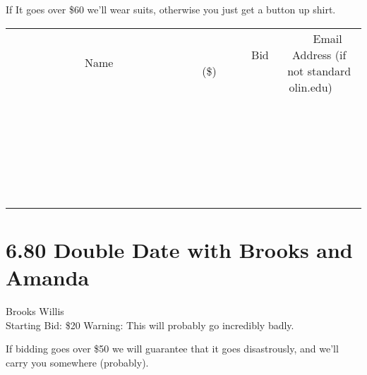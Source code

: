 \documentclass[11pt]{article}
\begin{document}
If It goes over \$60 we'll wear suits, otherwise you just get a button up shirt.
\\[6ex]
\begin{tabular}{c c c}
~~~~~~~~~~~~~Name~~~~~~~~~~~~~ & ~~~~~~~~~Bid (\$)~~~~~~~~~  & ~~~Email Address (if not standard olin.edu)~~~\\
 & & \\
\hline
 & & \\
\hline
 & & \\
\hline
 & & \\
\hline
 & & \\
\hline
 & & \\
\hline
 & & \\
\hline
 & & \\
\hline
 & & \\
\hline
 & & \\
\hline
 & & \\
\hline
 & & \\
\hline
 & & \\
\hline
 & & \\
\hline
 & & \\
\hline
 & & \\
\hline
 & & \\
\hline
 & & \\
\hline
 & & \\
\hline
 & & \\
\hline
 & & \\
\hline
 & & \\
\hline
 & & \\
\hline
 & & \\
\hline
 & & \\
\hline
 & & \\
\hline
\end{tabular}
\newpage
\section*{6.80 Double Date with Brooks and Amanda}
Brooks Willis
\\
Starting Bid: \$20
\newline
Warning: This will probably go incredibly badly.

If bidding goes over \$50 we will guarantee that it goes disastrously, and we'll carry you somewhere (probably).
\end{document}

